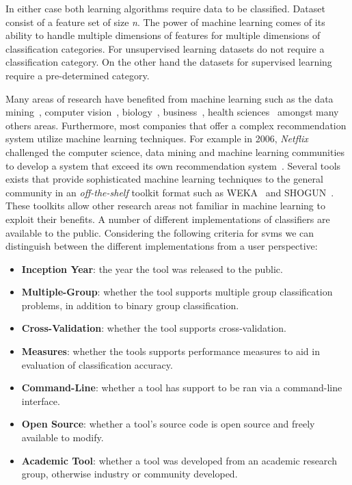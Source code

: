 In either case both learning algorithms require data to be classified. Dataset consist of a feature set of size \emph{n}. The power of machine learning comes of its ability to handle multiple dimensions of features for multiple dimensions of classification categories. For unsupervised learning datasets do not require a classification category. On the other hand the datasets for supervised learning require a pre-determined category.

Many areas of research have benefited from machine learning such as the data mining~\cite{WFH11}, computer vision~\cite{Her03}, biology~\cite{OLP08}, business~\cite{Her00}, health sciences~\cite{Kon01} amongst many others areas. Furthermore, most companies that offer a complex recommendation system utilize machine learning techniques. For example in 2006, \emph{Netflix} challenged the computer science, data mining and machine learning communities to develop a system that exceed its own recommendation system~\cite{BL07}. Several tools exists that provide sophisticated machine learning techniques to the general community in an \emph{off-the-shelf} toolkit format such as WEKA~\cite{HFH+09} and SHOGUN~\cite{SRH+10}. These toolkits allow other research areas not familiar in machine learning to exploit their benefits. A number of different implementations of classifiers are available to the public. Considering the following criteria for \gls{svm}s we can distinguish between the different implementations from a user perspective:

\begin{itemize}
  \item \textbf{Inception Year}: the year the tool was released to the public.
  \item \textbf{Multiple-Group}: whether the tool supports multiple group classification problems, in addition to binary group classification.
  \item \textbf{Cross-Validation}: whether the tool supports cross-validation.
  \item \textbf{Measures}: whether the tools supports performance measures to aid in evaluation of classification accuracy.
  \item \textbf{Command-Line}: whether a tool has support to be ran via a command-line interface.
  \item \textbf{Open Source}: whether a tool's source code is open source and freely available to modify.
  \item \textbf{Academic Tool}: whether a tool was developed from an academic research group, otherwise industry or community developed.
\end{itemize}

